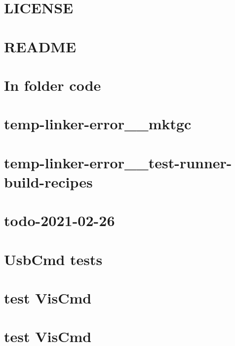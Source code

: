 \let\mypdfximage\pdfximage\def\pdfximage{\immediate\mypdfximage}\documentclass[twoside]{book}
\newcommand{\+}{\discretionary{\mbox{\scriptsize$\hookleftarrow$}}{}{}}
\begin{document}
\chapter{LICENSE}
\label{md_mock_c_LICENSE}

\chapter{README}
\label{md_mock_c_README}

\chapter{In folder code}
\label{md_mock_c_vim_cheatsheet}

\chapter{temp-\/linker-\/error\+\_\+\+\_\+mktgc}
\label{md_temp_linker_error__mktgc}

\chapter{temp-\/linker-\/error\+\_\+\+\_\+test-\/runner-\/build-\/recipes}
\label{md_temp_linker_error__test_runner_build_recipes}

\chapter{todo-\/2021-\/02-\/26}
\label{md_todo_2021_02_26}

\chapter{Usb\+Cmd tests}
\label{md_usb_bridge_build_test_runner}

\chapter{test Vis\+Cmd}
\label{md_vis_spi_out_build_test_runner}

\chapter{test Vis\+Cmd}
\label{md_vis_spi_out_build_test_runner_LIS}

\end{document}
